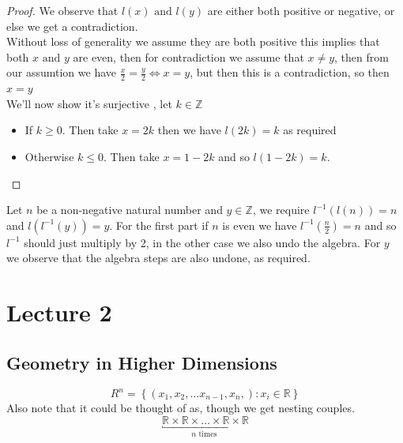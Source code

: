\documentclass[11pt]{book}
\begin{document}
\begin{enumerate}
\begin{proof}
        We observe that $l\left(x\right) \text{ and } l\left(y\right) $ are either both positive or negative, or else we get a contradiction. \\
        Without loss of generality we assume they are both positive this implies that both $x \text{ and } y$ are even, then for contradiction we assume that $x \neq y$, then from our assumtion we have $\frac{x}{2}= \frac{y}{2} \Leftrightarrow x = y $, but then this is a contradiction, so then $x = y$ \\
        We'll now show it's surjective , let $k \in \mathbb{Z} $ 
        \begin{itemize}
            \item If $k \ge 0$. Then take $x= 2k$ then we have $l\left(2k\right) = k $ as required
            \item Otherwise $k \le 0$. Then take $x = 1 - 2k$ and so $l\left(1 - 2k\right) = k$. 
        \end{itemize}
        \end{proof}
        Let $n$ be a non-negative natural number and $y \in  \mathbb{Z} $, we require $l^{-1} \left(l\left(n\right) \right) = n$ and $  l\left(l^{-1} \left(y\right) \right) = y$. For the first part if $n$ is even we have $l^{-1} \left(\frac{n}{2}\right) = n$ and so $l^{-1} $ should just multiply by 2, in the other case we also undo the algebra. For $y$ we observe that the algebra steps are also undone, as required.
\end{enumerate}

\newpage


\chapter{Lecture 2}%
\label{chp:lecture_2}

\section{Geometry in Higher Dimensions}%
\label{sec:geometry_in_higher_dimensions}

\begin{defn}[$R^{n} $ ]\label{defn:_r_n_}
    \[
        R^{n} = \left\{ \left( x_{1},  x_{2},  \dotsc   x_{n - 1},  x_{n},  \right): x_{i} \in \mathbb{R}   \right\} 
    \]
    Also note that it could be thought of as, though we get nesting couples.
    \[
        \underbracket{ \mathbb{R} \times \mathbb{R} \times \ldots \times \mathbb{R} \times \mathbb{R} }_{n \text{ times } }
    \]
\end{defn}
\end{document}
